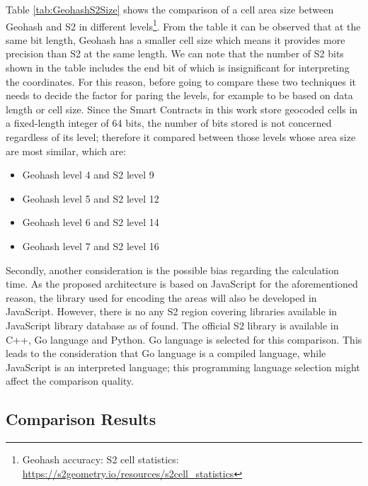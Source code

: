 \npara Table \ref{tab:GeohashS2Size} shows the comparison of a cell area size between Geohash and S2 in different levels\footnote{
  \npara Geohash accuracy:\newline\href{https://stackoverflow.com/questions/13448595/geohash-string-length-and-accuracy}{}\newline
  \npara S2 cell statistics: \url{https://s2geometry.io/resources/s2cell_statistics}
}.
From the table it can be observed that at the same bit length, Geohash has a smaller cell size which means it provides more precision than S2 at the same length.
We can note that the number of S2 bits shown in the table includes the end bit of  which is insignificant for interpreting the coordinates.
For this reason, before going to compare these two techniques it needs to decide the factor for paring the levels, for example to be based on data length or cell size.
Since the Smart Contracts in this work store geocoded cells in a fixed-length integer of 64 bits, the number of bits stored is not concerned regardless of its level; therefore it compared between those levels whose area size are most similar, which are:

\begin{itemize}
  \item Geohash level 4 and S2 level 9
  \item Geohash level 5 and S2 level 12
  \item Geohash level 6 and S2 level 14
  \item Geohash level 7 and S2 level 16
\end{itemize}

Secondly, another consideration is the possible bias regarding the calculation time.
As the proposed architecture is based on JavaScript for the aforementioned reason, the library used for encoding the areas will also be developed in JavaScript.
However, there is no any S2 region covering libraries available in JavaScript library database as of found.
The official S2 library is available in C++, Go language and Python.
Go language is selected for this comparison.
This leads to the consideration that Go language is a compiled language, while JavaScript is an interpreted language; this programming language selection might affect the comparison quality.

\subsection{Comparison Results} \label{Results-TechniqueComparison-Results}

